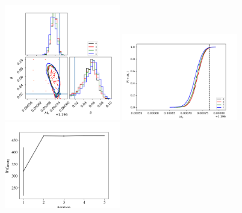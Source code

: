 \documentclass[twocolumn,prd,nofootinbib]{revtex4}
\begin{document}
\begin{figure}
\includegraphics[width=0.45\textwidth]{figures/bns_zerospin_corner_mc_delta_mc.png}
\includegraphics[width=0.45\textwidth]{figures/bns_zerospin_mc_cum.png}
\includegraphics[width=0.45\textwidth]{figures/bns_zerospin_lnL_meanVar.png}

\end{figure}
\end{document}
